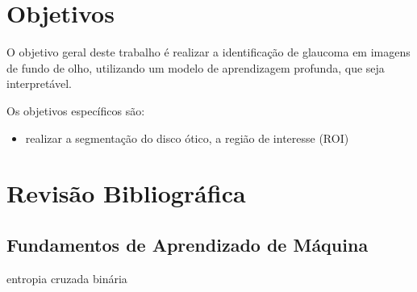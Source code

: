 \documentclass[12pt]{article}
\begin{document}
\section{Objetivos}
\label{sec:objetivo}

O objetivo geral deste trabalho é realizar a identificação de glaucoma em imagens de fundo de olho, utilizando um modelo de aprendizagem profunda, que seja interpretável.

Os objetivos específicos são:
\begin{itemize}
 \item realizar a segmentação do disco ótico, a região de interesse (ROI)
\end{itemize}

\bigskip

\section{Revisão Bibliográfica}
\label{sec:review}

\subsection{Fundamentos de Aprendizado de Máquina}
\label{sec:fundamentals}







entropia cruzada binária
\end{document}
